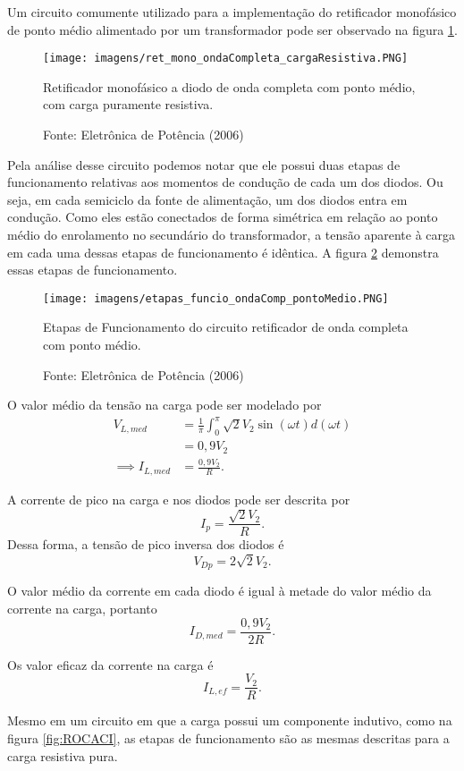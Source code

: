 Um circuito comumente utilizado para a implementação do retificador monofásico de ponto médio alimentado por um transformador pode ser observado na figura \ref{fig:RMOCDPM}. 

\begin{figure}[ht]
\center
\texttt{[image: imagens/ret\_mono\_ondaCompleta\_cargaResistiva.PNG]}
\caption{Retificador monofásico a diodo de onda completa com ponto médio, com carga puramente resistiva.}\label{fig:RMOCDPM}
\caption*{Fonte: Eletrônica de Potência (2006)}
\end{figure}

Pela análise desse circuito podemos notar que ele possui duas etapas de funcionamento relativas aos momentos de condução de cada um dos diodos. Ou seja, em cada semiciclo da fonte de alimentação, um dos diodos entra em condução. Como eles estão conectados de forma simétrica em relação ao ponto médio do enrolamento no secundário do transformador, a tensão aparente à carga em cada uma dessas etapas de funcionamento é idêntica. A figura \ref{fig:EFCR} demonstra essas etapas de funcionamento.

\begin{figure}[ht]
\center
\texttt{[image: imagens/etapas\_funcio\_ondaComp\_pontoMedio.PNG]}
\caption{Etapas de Funcionamento do circuito retificador de onda completa com ponto médio.}\label{fig:EFCR}
\caption*{Fonte: Eletrônica de Potência (2006)}
\end{figure}

O valor médio da tensão na carga pode ser modelado por
\begin{align*}
    V_{L,med} &= \frac{1}{\pi}{\int_{0}^{\pi}}{\sqrt{2}V_2{\sin(\omega{t})d(\omega{t})}} \\
	      &= 0,9 V_2 \\
    \implies I_{L,med} &= \frac{0,9 V_2}{R}
.\end{align*}

A corrente de pico na carga e nos diodos pode ser descrita por \[
I_{p} = \frac{\sqrt{2}V_2}{R}
.\] Dessa forma, a tensão de pico inversa dos diodos é \[
V_{Dp} = {2}\sqrt{2}V_2
.\] 

O valor médio da corrente em cada diodo é igual à metade do valor médio da corrente na carga, portanto \[
I_{D,med} = \frac{0,9 V_2}{2R}
.\] 

Os valor eficaz da corrente na carga é \[
I_{L,ef} = \frac{V_2}{R}
.\] 

Mesmo em um circuito em que a carga possui um componente indutivo, como na figura \ref{fig:ROCACI}, as etapas de funcionamento são as mesmas descritas para a carga resistiva pura.

